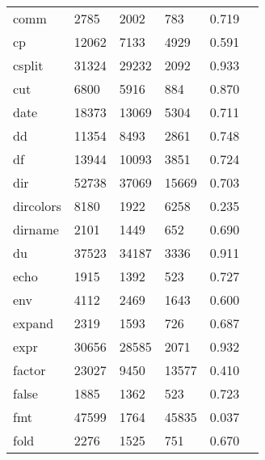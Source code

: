 \begin{longtable}{lp{2.40cm}p{2.40cm}p{2.40cm}p{2.40cm}p{2.40cm}}
comm      &                     2785 &         2002 &           783 &                    0.719 \\
cp        &                    12062 &         7133 &          4929 &                    0.591 \\
csplit    &                    31324 &        29232 &          2092 &                    0.933 \\
cut       &                     6800 &         5916 &           884 &                    0.870 \\
date      &                    18373 &        13069 &          5304 &                    0.711 \\
dd        &                    11354 &         8493 &          2861 &                    0.748 \\
df        &                    13944 &        10093 &          3851 &                    0.724 \\
dir       &                    52738 &        37069 &         15669 &                    0.703 \\
dircolors &                     8180 &         1922 &          6258 &                    0.235 \\
dirname   &                     2101 &         1449 &           652 &                    0.690 \\
du        &                    37523 &        34187 &          3336 &                    0.911 \\
echo      &                     1915 &         1392 &           523 &                    0.727 \\
env       &                     4112 &         2469 &          1643 &                    0.600 \\
expand    &                     2319 &         1593 &           726 &                    0.687 \\
expr      &                    30656 &        28585 &          2071 &                    0.932 \\
factor    &                    23027 &         9450 &         13577 &                    0.410 \\
false     &                     1885 &         1362 &           523 &                    0.723 \\
fmt       &                    47599 &         1764 &         45835 &                    0.037 \\
fold      &                     2276 &         1525 &           751 &                    0.670 \\

\end{longtable}
